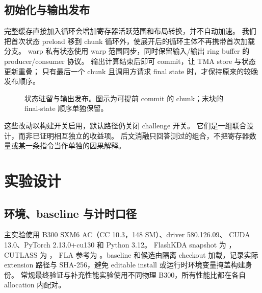 \documentclass[11pt,a4paper,fontset=none]{ctexart}
\newcommand{\code}[1]{\texttt{\detokenize{#1}}}
\begin{document}
\subsection{初始化与输出发布}
完整缓存直接加入循环会增加寄存器活跃范围和布局转换，并不自动加速。
我们把首次状态 preload 移到 chunk 循环外，使展开后的循环主体不再携带首次加载分支。
warp 私有状态使用 warp 范围同步，同时保留输入/输出 ring buffer 的 producer/consumer 协议。
输出计算结束后即可 commit，让 TMA store 与状态更新重叠；
只有最后一个 chunk 且调用方请求 final state 时，才保持原来的较晚发布顺序。

\begin{figure}[htbp]\centering
{}
\caption{状态驻留与输出发布。图示为可提前 commit 的 chunk；末块的 final-state 顺序单独保留。}
\label{fig:schedule}
\end{figure}

这些改动以构建开关启用，默认路径仍关闭 challenge 开关。
它们是一组联合设计，而非已证明相互独立的收益项。
后文消融只回答测过的组合，不把寄存器数量或某一条指令当作单独的因果解释。

\section{实验设计}
\subsection{环境、baseline 与计时口径}
主实验使用 B300 SXM6 AC（CC 10.3，148 SM）、driver 580.126.09、
CUDA 13.0、PyTorch 2.13.0+cu130 和 Python 3.12。
FlashKDA snapshot 为 \code{1ce47ea}，CUTLASS 为 \code{5c149f52}，
FLA 参考为 \code{a3edffc}。baseline 和候选由隔离 checkout 加载，记录实际 extension
路径与 SHA-256，避免 editable install 或运行时环境变量掩盖构建身份。
常规最终验证与补充性能实验使用不同物理 B300，所有性能比都在各自 allocation 内配对。
\end{document}
